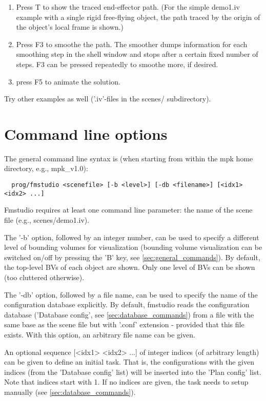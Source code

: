 \documentclass[letter,12pt]{article}
\begin{document}
\begin{enumerate}
\item Press T to show the traced end-effector path.  (For the simple
  demo1.iv example with a single rigid free-flying object, the path
  traced by the origin of the object's local frame is shown.)
  
\item Press F3 to smoothe the path. The smoother dumps information for
  each smoothing step in the shell window and stops after a certain
  fixed number of steps.  F3 can be pressed repeatedly to smoothe
  more, if desired.

\item press F5 to animate the solution.

\end{enumerate}

Try other examples as well ('.iv'-files in the scenes/ subdirectory).


\section{Command line options}
\label{sec:command_line_options}

The general command line syntax is (when starting from within the mpk
home directory, e.g., mpk_v1.0):

\begin{verbatim}
  prog/fmstudio <scenefile> [-b <level>] [-db <filename>] [<idx1> <idx2> ...]
\end{verbatim}

Fmstudio requires at least one command line parameter: the name of the
scene file (e.g., scenes/demo1.iv).

The '-b' option, followed by an integer number, can be used to specify
a different level of bounding volumes for visualization (bounding
volume visualization can be switched on/off by pressing the 'B' key,
see \ref{sec:general_commands}).  By default, the top-level BVs of
each object are shown.  Only one level of BVs can be shown (too
cluttered otherwise).

The '-db' option, followed by a file name, can be used to specify the
name of the configuration database explicitly.  By default, fmstudio
reads the configuration database ('Database config', see
\ref{sec:database_commands}) from a file with the same base as the
scene file but with '.conf' extension - provided that this file
exists.  With this option, an arbitrary file name can be given.

An optional sequence [<idx1> <idx2> ...] of integer indices (of
arbitrary length) can be given to define an initial task.  That is,
the configurations with the given indices (from the 'Database config'
list) will be inserted into the 'Plan config' list.  Note that indices
start with 1.  If no indices are given, the task needs to setup
manually (see \ref{sec:database_commands}).
\end{document}
